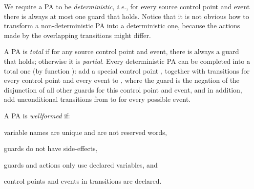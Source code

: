 We require a PA to be \emph{deterministic}, \emph{i.e.}, for every source
control point and event there is always at most one guard that holds.
Notice that it is not obvious how to transform a non-deterministic PA into
a deterministic one, because the actions made by the overlapping transitions
might differ.

A PA is \emph{total} if for any source control point and event,
there is always a guard that holds; otherwise it is
\emph{partial}. Every deterministic PA can be completed into a total
one (by function \complete): add a special control point
\halted, together with transitions for every control point and every event
to \halted, where the guard is the negation of the
disjunction of all other guards for this control point and event, and
in addition, add unconditional transitions from \halted to \halted
for every possible event.

A PA is \emph{wellformed} if:
\begin{inparaenum}
\item variable names are unique and are not reserved words,
\item guards do not have side-effects,
\item guards and actions only use declared variables, and
\item control points and events in transitions are declared.
\end{inparaenum}

